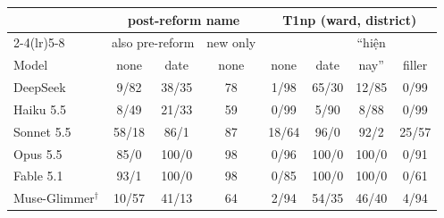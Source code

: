 \begin{tabular}{@{}l ccc cccc@{}}
\toprule
 & \multicolumn{3}{c}{post-reform name} & \multicolumn{4}{c}{T1np (ward, district)} \\
\cmidrule(lr){2-4}\cmidrule(lr){5-8}
 & \multicolumn{2}{c}{also pre-reform} & new only & & & ``hiện & \\
Model & none & date & none & none & date & nay'' & filler \\
\midrule
DeepSeek & 9/82 & 38/35 & 78 & 1/98 & 65/30 & 12/85 & 0/99 \\
Haiku 5.5 & 8/49 & 21/33 & 59 & 0/99 & 5/90 & 8/88 & 0/99 \\
Sonnet 5.5 & 58/18 & 86/1 & 87 & 18/64 & 96/0 & 92/2 & 25/57 \\
Opus 5.5 & 85/0 & 100/0 & 98 & 0/96 & 100/0 & 100/0 & 0/91 \\
Fable 5.1 & 93/1 & 100/0 & 98 & 0/85 & 100/0 & 100/0 & 0/61 \\
Muse-Glimmer$^\dagger$ & 10/57 & 41/13 & 64 & 2/94 & 54/35 & 46/40 & 4/94 \\
\bottomrule
\end{tabular}
